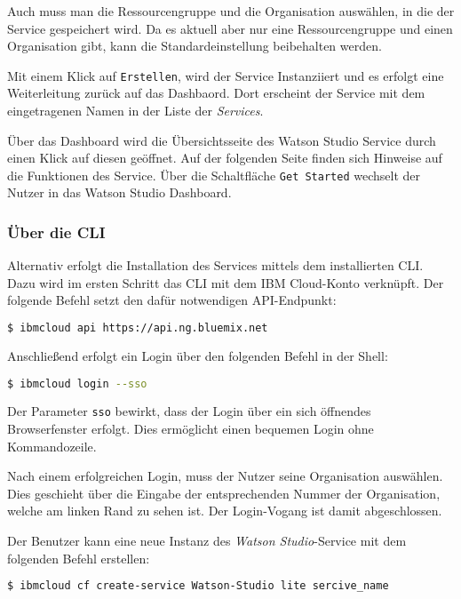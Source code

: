Auch muss man die Ressourcengruppe und die Organisation auswählen, in die der Service gespeichert wird. Da es aktuell aber
nur eine Ressourcengruppe und einen Organisation gibt, kann die Standardeinstellung beibehalten werden.

Mit einem Klick auf \texttt{Erstellen}, wird der Service Instanziiert und es erfolgt eine Weiterleitung zurück auf das
Dashbaord. Dort erscheint der Service mit dem eingetragenen Namen in der Liste der \textit{Services}.

Über das Dashboard wird die Übersichtsseite des Watson Studio Service durch einen Klick auf diesen geöffnet. Auf der
folgenden Seite finden sich Hinweise auf die Funktionen des Service. Über die Schaltfläche \texttt{Get Started} wechselt
der Nutzer in das Watson Studio Dashboard.

\subsubsection*{Über die CLI}
Alternativ erfolgt die Installation des Services mittels dem installierten CLI. Dazu wird im ersten Schritt das CLI mit
dem IBM Cloud-Konto verknüpft. Der folgende Befehl setzt den dafür notwendigen API-Endpunkt:

\begin{lstlisting}[language=bash, caption=Setzen des API Targets, label=Setzen des API Targets]
    $ ibmcloud api https://api.ng.bluemix.net
\end{lstlisting}

Anschließend erfolgt ein Login über den folgenden Befehl in der Shell:

\begin{lstlisting}[language=bash, caption=Login über CLI und Single Sign-on, label=Login über CLI und SSO]
    $ ibmcloud login --sso
\end{lstlisting}

Der Parameter \texttt{sso} bewirkt, dass der Login über ein sich öffnendes Browserfenster erfolgt. Dies ermöglicht einen
bequemen Login ohne Kommandozeile.

Nach einem erfolgreichen Login, muss der Nutzer seine Organisation auswählen. Dies geschieht über die Eingabe der
entsprechenden Nummer der Organisation, welche am linken Rand zu sehen ist. Der Login-Vogang ist damit abgeschlossen.

Der Benutzer kann eine neue Instanz des \textit{Watson Studio}-Service mit dem folgenden Befehl erstellen:

\begin{lstlisting}[language=bash, caption=Instanziierung des Watson Studio Services, label=Instanziierung des Watson Studio Services]
    $ ibmcloud cf create-service Watson-Studio lite sercive_name
\end{lstlisting}

